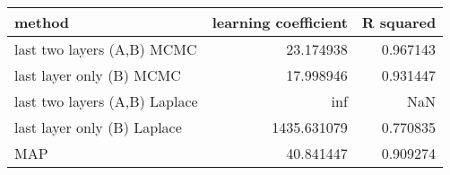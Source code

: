 \begin{tabular}{lrr}
\toprule
                        method &  learning coefficient &  R squared \\
\midrule
    last two layers (A,B) MCMC &             23.174938 &   0.967143 \\
      last layer only (B) MCMC &             17.998946 &   0.931447 \\
 last two layers (A,B) Laplace &                   inf &        NaN \\
   last layer only (B) Laplace &           1435.631079 &   0.770835 \\
                           MAP &             40.841447 &   0.909274 \\
\bottomrule
\end{tabular}
